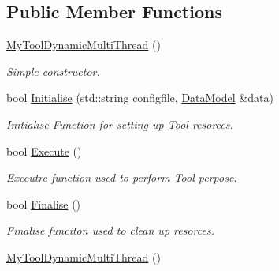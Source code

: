 \subsection*{Public Member Functions}
\begin{DoxyCompactItemize}
\item 
\hypertarget{classMyToolDynamicMultiThread_a5eec7239400c507754ba6218b3eb8d4a}{\hyperlink{classMyToolDynamicMultiThread_a5eec7239400c507754ba6218b3eb8d4a}{My\-Tool\-Dynamic\-Multi\-Thread} ()}\label{classMyToolDynamicMultiThread_a5eec7239400c507754ba6218b3eb8d4a}

\begin{DoxyCompactList}\small\item\em Simple constructor. \end{DoxyCompactList}\item 
bool \hyperlink{classMyToolDynamicMultiThread_ac082408d85bc3e76214e55d4f62de0da}{Initialise} (std\-::string configfile, \hyperlink{classDataModel}{Data\-Model} \&data)
\begin{DoxyCompactList}\small\item\em Initialise Function for setting up \hyperlink{classTool}{Tool} resorces. \end{DoxyCompactList}\item 
\hypertarget{classMyToolDynamicMultiThread_aec2f9af9495520d74bb154d626a94a63}{bool \hyperlink{classMyToolDynamicMultiThread_aec2f9af9495520d74bb154d626a94a63}{Execute} ()}\label{classMyToolDynamicMultiThread_aec2f9af9495520d74bb154d626a94a63}

\begin{DoxyCompactList}\small\item\em Executre function used to perform \hyperlink{classTool}{Tool} perpose. \end{DoxyCompactList}\item 
\hypertarget{classMyToolDynamicMultiThread_ab70e77b0fd90e50c5103ccfa0bfd6485}{bool \hyperlink{classMyToolDynamicMultiThread_ab70e77b0fd90e50c5103ccfa0bfd6485}{Finalise} ()}\label{classMyToolDynamicMultiThread_ab70e77b0fd90e50c5103ccfa0bfd6485}

\begin{DoxyCompactList}\small\item\em Finalise funciton used to clean up resorces. \end{DoxyCompactList}\item 
\hypertarget{classMyToolDynamicMultiThread_a5eec7239400c507754ba6218b3eb8d4a}{\hyperlink{classMyToolDynamicMultiThread_a5eec7239400c507754ba6218b3eb8d4a}{My\-Tool\-Dynamic\-Multi\-Thread} ()}\label{classMyToolDynamicMultiThread_a5eec7239400c507754ba6218b3eb8d4a}


\end{DoxyCompactItemize}

